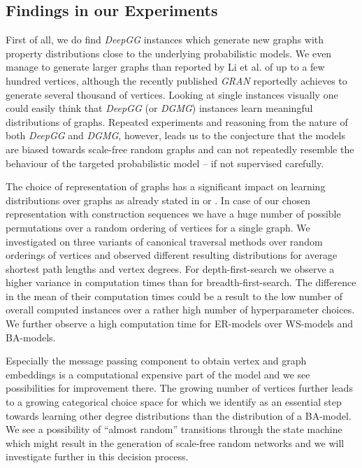 \documentclass{article}
\begin{document}
\subsection{Findings in our Experiments}
First of all, we do find \textit{DeepGG} instances which generate new graphs with property distributions close to the underlying probabilistic models.
We even manage to generate larger graphs than reported by Li et al. of up to a few hundred vertices, although the recently published \textit{GRAN} reportedly achieves to generate several thousand of vertices.
Looking at single instances visually one could easily think that \textit{DeepGG} (or \textit{DGMG}) instances learn meaningful distributions of graphs.
Repeated experiments and reasoning from the nature of both \textit{DeepGG} and \textit{DGMG}, however, leads us to the conjecture that the models are biased towards scale-free random graphs and can not repeatedly resemble the behaviour of the targeted probabilistic model -- if not supervised carefully.

The choice of representation of graphs has a significant impact on learning distributions over graphs as already stated in \cite{you2018graphrnn} or \cite{liao2019efficient}.
In case of our chosen representation with construction sequences we have a huge number of possible permutations over a random ordering of vertices for a single graph.
We investigated on three variants of canonical traversal methods over random orderings of vertices and observed different resulting distributions for average shortest path lengths and vertex degrees.
For depth-first-search we observe a higher variance in computation times than for breadth-first-search.
The difference in the mean of their computation times could be a result to the low number of overall computed instances over a rather high number of hyperparameter choices.
We further observe a high computation time for ER-models over WS-models and BA-models.

Especially the message passing component to obtain vertex and graph embeddings is a computational expensive part of the model and we see possibilities for improvement there.
The growing number of vertices further leads to a growing categorical choice space for  which we identify as an essential step towards learning other degree distributions than the distribution of a BA-model.
We see a possibility of ``almost random'' transitions through the state machine which might result in the generation of scale-free random networks and we will investigate further in this decision process.
\end{document}
